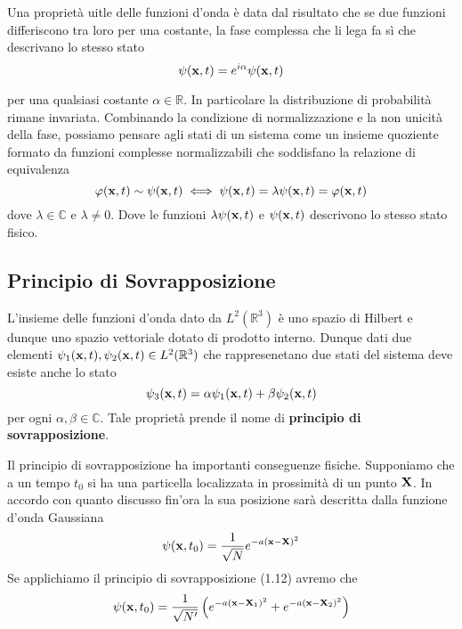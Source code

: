 \noindent Una propriet\`a uitle delle funzioni d'onda \`e data dal risultato che se due funzioni differiscono tra loro per una costante, la fase complessa che li lega fa s\`i che descrivano lo stesso stato
\begin{equation*}
	\psi(\bold{x},t) = e^{i\alpha}\psi(\bold{x},t)
\end{equation*}

per una qualsiasi costante $\alpha \in \mathbb{R}$. In particolare la distribuzione di probabilit\`a rimane invariata. Combinando la condizione di normalizzazione e la non unicit\`a della fase, possiamo pensare agli stati di un sistema come un insieme quoziente formato da funzioni complesse normalizzabili che soddisfano la relazione di equivalenza 
\begin{equation}
	\varphi(\bold{x},t) \sim \psi(\bold{x},t) \iff \psi(\bold{x},t) = \lambda \psi(\bold{x},t) = \varphi(\bold{x},t)
\end{equation}
dove $\lambda \in \mathbb{C}$ e $\lambda \neq 0$. Dove le funzioni $\lambda \psi(\bold{x},t)$ e $\psi(\bold{x},t)$ descrivono lo stesso stato fisico.

\subsection{Principio di Sovrapposizione}
L'insieme delle funzioni d'onda dato da $L^2(\mathbb{R}^3)$ \`e uno spazio di Hilbert e dunque uno spazio vettoriale dotato di prodotto interno. Dunque dati due elementi $\psi_1(\bold{x},t),\psi_2(\bold{x},t) \in L^2(\mathbb{R}^3)$ che rappresenetano due stati del sistema deve esiste anche lo stato
\begin{equation}
	\psi_{3}(\bold{x},t) = \alpha \psi_{1}(\bold{x},t) + \beta \psi_2(\bold{x},t)
\end{equation}
per ogni $\alpha,\beta \in \mathbb{C}$. Tale propriet\`a prende il nome di \textbf{principio di sovrapposizione}. 

\noindent Il principio di sovrapposizione ha importanti conseguenze fisiche. Supponiamo che a un tempo $t_0$ si ha una particella localizzata in prossimit\`a di un punto $\bold{X}$. In accordo con quanto discusso fin'ora la sua posizione sar\`a descritta dalla funzione d'onda Gaussiana
\begin{equation*}
	\psi(\bold{x},t_0) = \frac{1}{\sqrt{N}}e^{-a(\bold{x}-\bold{X})^2}
\end{equation*}
Se applichiamo il principio di sovrapposizione (1.12) avremo che 
\begin{equation*}
	\psi(\bold{x},t_0) = \frac{1}{\sqrt{N'}}\left( e^{-a(\bold{x}-\bold{X}_1)^2}+e^{-a(\bold{x}-\bold{X}_2)^2}\right )
\end{equation*}

